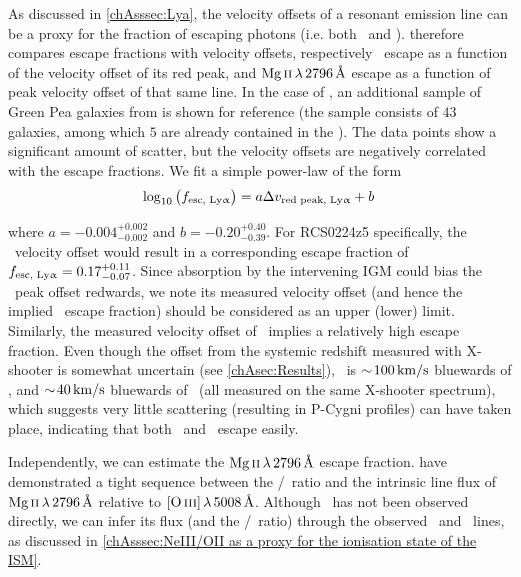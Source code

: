 As discussed in \cref{chAsssec:Lya}, the velocity offsets of a resonant emission line can be a proxy for the fraction of escaping photons (i.e. both \lya\ and \MgII).  therefore compares escape fractions with velocity offsets, respectively \lya\ escape as a function of the velocity offset of its red peak, and $\MgII \, \lambda \, 2796 \, \Angstrom$ escape as a function of peak velocity offset of that same line. In the case of \lya, an additional sample of Green Pea galaxies from \citet{2016ApJ...820..130Y, 2017ApJ...844..171Y} is shown for reference (the sample consists of $43$ galaxies, among which $5$ are already contained in the \Isample). The data points show a significant amount of scatter, but the velocity offsets are negatively correlated with the escape fractions. We fit a simple power-law of the form
\begin{equation}
    \log_{10} \left( f_\text{esc, {Ly\ensuremath{\upalpha}}} \right) = a \Delta v_\text{red peak, {Ly\ensuremath{\upalpha}}} + b \, 
\end{equation}

\noindent where $a = -0.004_{-0.002}^{+0.002}$ and $b = -0.20_{-0.39}^{+0.40}$. For RCS0224z5 specifically, the \lya\ velocity offset would result in a corresponding escape fraction of $f_\text{esc, {Ly\ensuremath{\upalpha}}} = 0.17_{-0.07}^{+0.11}$. Since absorption by the intervening IGM could bias the \lya\ peak offset redwards, we note its measured velocity offset (and hence the implied \lya\ escape fraction) should be considered as an upper (lower) limit. Similarly, the measured velocity offset of \MgII\ implies a relatively high escape fraction. Even though the offset from the systemic redshift measured with X-shooter is somewhat uncertain (see \cref{chAsec:Results}), \MgII\ is $\sim \! 100 \, \mathrm{km/s}$ bluewards of \lya, and $\sim \! 40 \, \mathrm{km/s}$ bluewards of \CIV\ (all measured on the same X-shooter spectrum), which suggests very little scattering (resulting in P-Cygni profiles) can have taken place, indicating that both \lya\ and \MgII\ escape easily.

Independently, we can estimate the $\MgII \, \lambda \, 2796 \, \Angstrom$ escape fraction. \citet{2018ApJ...855...96H} have demonstrated a tight sequence between the \OIIIf/\OII\ ratio and the intrinsic line flux of $\MgII \, \lambda \, 2796 \, \Angstrom$ relative to $\OIIIf \, \lambda \, 5008 \, \Angstrom$. Although \OIIIf\ has not been observed directly, we can infer its flux (and the \OIIIf/\OII\ ratio) through the observed \NeIII\ and \OII\ lines, as discussed in \cref{chAsssec:NeIII/OII as a proxy for the ionisation state of the ISM}.

